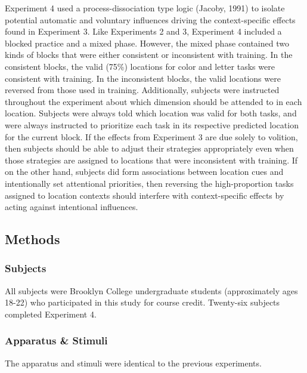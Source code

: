 \documentclass[]{DissertateCUNY}
\begin{document}
Experiment 4 used a process-dissociation type logic (Jacoby, 1991) to
isolate potential automatic and voluntary influences driving the
context-specific effects found in Experiment 3. Like Experiments 2 and
3, Experiment 4 included a blocked practice and a mixed phase. However,
the mixed phase contained two kinds of blocks that were either
consistent or inconsistent with training. In the consistent blocks, the
valid (75\%) locations for color and letter tasks were consistent with
training. In the inconsistent blocks, the valid locations were reversed
from those used in training. Additionally, subjects were instructed
throughout the experiment about which dimension should be attended to in
each location. Subjects were always told which location was valid for
both tasks, and were always instructed to prioritize each task in its
respective predicted location for the current block. If the effects from
Experiment 3 are due solely to volition, then subjects should be able to
adjust their strategies appropriately even when those strategies are
assigned to locations that were inconsistent with training. If on the
other hand, subjects did form associations between location cues and
intentionally set attentional priorities, then reversing the
high-proportion tasks assigned to location contexts should interfere
with context-specific effects by acting against intentional influences.

\hypertarget{methods-3}{%
\subsection{Methods}\label{methods-3}}

\hypertarget{subjects-3}{%
\subsubsection{Subjects}\label{subjects-3}}

All subjects were Brooklyn College undergraduate students (approximately
ages 18-22) who participated in this study for course credit. Twenty-six
subjects completed Experiment 4.

\hypertarget{apparatus-stimuli-3}{%
\subsubsection{Apparatus \& Stimuli}\label{apparatus-stimuli-3}}

The apparatus and stimuli were identical to the previous experiments.
\end{document}
